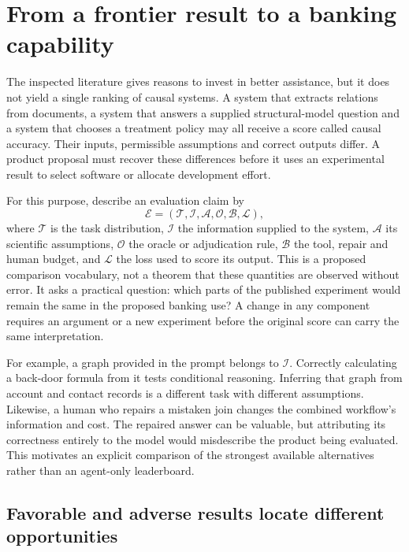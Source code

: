 \section{From a frontier result to a banking capability}
\label{exec13:frontier-synthesis}

The inspected literature gives reasons to invest in better assistance, but it
does not yield a single ranking of causal systems. A system that extracts
relations from documents, a system that answers a supplied structural-model
question and a system that chooses a treatment policy may all receive a score
called causal accuracy. Their inputs, permissible assumptions and correct
outputs differ. A product proposal must recover these differences before it
uses an experimental result to select software or allocate development effort.

For this purpose, describe an evaluation claim by
\begin{equation}
 \mathcal E=(\mathcal T,\mathcal I,\mathcal A,\mathcal O,\mathcal B,\mathcal L),
 \label{exec13:frontier-claim}
\end{equation}
where $\mathcal T$ is the task distribution, $\mathcal I$ the information
supplied to the system, $\mathcal A$ its scientific assumptions, $\mathcal O$
the oracle or adjudication rule, $\mathcal B$ the tool, repair and human budget,
and $\mathcal L$ the loss used to score its output. This is a proposed
comparison vocabulary, not a theorem that these quantities are observed without
error. It asks a practical question: which parts of the published experiment
would remain the same in the proposed banking use? A change in any component
requires an argument or a new experiment before the original score can carry
the same interpretation.

For example, a graph provided in the prompt belongs to $\mathcal I$. Correctly
calculating a back-door formula from it tests conditional reasoning. Inferring
that graph from account and contact records is a different task with different
assumptions. Likewise, a human who repairs a mistaken join changes the combined
workflow's information and cost. The repaired answer can be valuable, but
attributing its correctness entirely to the model would misdescribe the product
being evaluated. This motivates an explicit comparison of the strongest
available alternatives rather than an agent-only leaderboard.

\subsection{Favorable and adverse results locate different opportunities}

